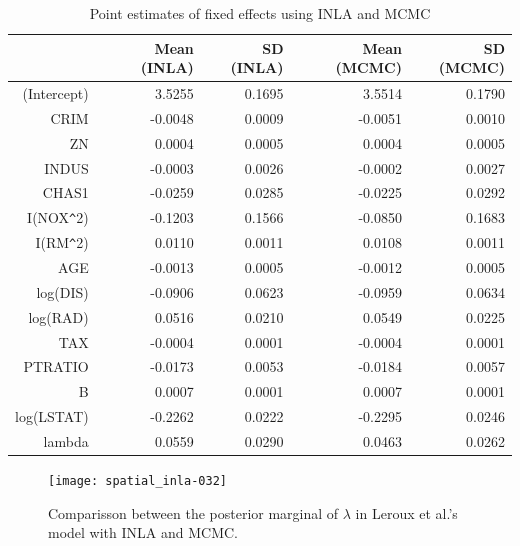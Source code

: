 \documentclass[article]{jss}
\begin{document}
\begin{table}[ht]
\centering
\begin{tabular}{rrrrr}
  \hline
 & Mean (INLA) & SD (INLA) & Mean (MCMC) & SD (MCMC) \\ 
  \hline
(Intercept) & 3.5255 & 0.1695 & 3.5514 & 0.1790 \\ 
  CRIM & -0.0048 & 0.0009 & -0.0051 & 0.0010 \\ 
  ZN & 0.0004 & 0.0005 & 0.0004 & 0.0005 \\ 
  INDUS & -0.0003 & 0.0026 & -0.0002 & 0.0027 \\ 
  CHAS1 & -0.0259 & 0.0285 & -0.0225 & 0.0292 \\ 
  I(NOX\verb|^|2) & -0.1203 & 0.1566 & -0.0850 & 0.1683 \\ 
  I(RM\verb|^|2) & 0.0110 & 0.0011 & 0.0108 & 0.0011 \\ 
  AGE & -0.0013 & 0.0005 & -0.0012 & 0.0005 \\ 
  log(DIS) & -0.0906 & 0.0623 & -0.0959 & 0.0634 \\ 
  log(RAD) & 0.0516 & 0.0210 & 0.0549 & 0.0225 \\ 
  TAX & -0.0004 & 0.0001 & -0.0004 & 0.0001 \\ 
  PTRATIO & -0.0173 & 0.0053 & -0.0184 & 0.0057 \\ 
  B & 0.0007 & 0.0001 & 0.0007 & 0.0001 \\ 
  log(LSTAT) & -0.2262 & 0.0222 & -0.2295 & 0.0246 \\ 
  lambda & 0.0559 & 0.0290 & 0.0463 & 0.0262 \\ 
   \hline
\end{tabular}
\caption{Point estimates of fixed effects using INLA and MCMC} 
\label{tab:leroux}
\end{table}

\begin{figure}[h]
\begin{center}
\texttt{[image: spatial\_inla-032]}
\end{center}
\caption{Comparisson between the posterior marginal of $\lambda$ in 
Leroux et al.'s model with INLA and MCMC.}
\label{fig:leroux}
\end{figure}



\end{document}
